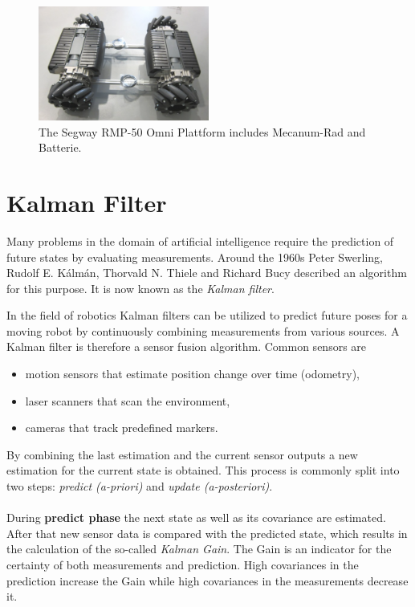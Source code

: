 \begin{figure}[ht]
      \centering
      \includegraphics[width=0.5\textwidth]{graphics/SegwayPlattform.png}
      \caption{The Segway RMP-50 Omni Plattform includes Mecanum-Rad and Batterie.}
      \label{Omni}
   \end{figure}

\section{Kalman Filter}
Many problems in the domain of artificial intelligence require the prediction of future states by evaluating measurements. Around the 1960s Peter Swerling, Rudolf E. Kálmán, Thorvald N. Thiele and Richard Bucy described an algorithm for this purpose. It is now known as the \textit{Kalman filter}.

In the field of robotics Kalman filters can be utilized to predict future poses for a moving robot by continuously combining measurements from various sources. A Kalman filter is therefore a sensor fusion algorithm. Common sensors are
 
\begin{itemize}
\item motion sensors that estimate position change over time (odometry),
\item laser scanners that scan the environment,
\item cameras that track predefined markers. 
\end{itemize}

By combining the last estimation and the current sensor outputs a new estimation for the current state is obtained. This process is commonly split into two steps: \textit{predict (a-priori)} and \textit{update (a-posteriori)}.
\\\\
During \textbf{predict phase} the next state as well as its covariance are estimated. After that new sensor data is compared with the predicted state, which results in the calculation of the so-called  \textit{Kalman Gain}. The Gain is an indicator for the certainty of both measurements and prediction. High covariances in the prediction increase the Gain while high covariances in the measurements decrease it.


